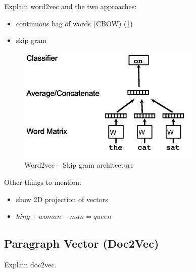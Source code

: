 Explain word2vec\cite{word2vec} and the two approaches:
\begin{itemize}
    \item continuous bag of words (CBOW) (\cref{fig:word2vec_skip_gram})
    \item skip gram
\end{itemize}

\begin{figure}[h]
	\centering
	\includegraphics[height=0.2\textheight]{img/word2vec_skip_gram}
    \caption{Word2vec -- Skip gram architecture\cite{doc2vec}}
    \label{fig:word2vec_skip_gram}
\end{figure}

Other things to mention:
\begin{itemize}
    \item show 2D projection of vectors
    \item $king + woman - man = queen$
\end{itemize}

\subsection{Paragraph Vector (Doc2Vec)}
Explain doc2vec\cite{doc2vec}.

